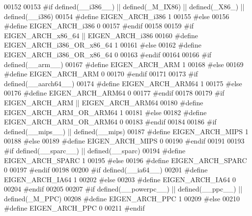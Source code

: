 \begin{DoxyCode}
00152 
00153 \textcolor{preprocessor}{#if defined(\_\_i386\_\_) || defined(\_M\_IX86) || defined(\_X86\_) || defined(\_\_i386)}
00154 \textcolor{preprocessor}{  #define EIGEN\_ARCH\_i386 1}
00155 \textcolor{preprocessor}{#else}
00156 \textcolor{preprocessor}{  #define EIGEN\_ARCH\_i386 0}
00157 \textcolor{preprocessor}{#endif}
00158 
00159 \textcolor{preprocessor}{#if EIGEN\_ARCH\_x86\_64 || EIGEN\_ARCH\_i386}
00160 \textcolor{preprocessor}{  #define EIGEN\_ARCH\_i386\_OR\_x86\_64 1}
00161 \textcolor{preprocessor}{#else}
00162 \textcolor{preprocessor}{  #define EIGEN\_ARCH\_i386\_OR\_x86\_64 0}
00163 \textcolor{preprocessor}{#endif}
00164 
00166 \textcolor{preprocessor}{#if defined(\_\_arm\_\_)}
00167 \textcolor{preprocessor}{  #define EIGEN\_ARCH\_ARM 1}
00168 \textcolor{preprocessor}{#else}
00169 \textcolor{preprocessor}{  #define EIGEN\_ARCH\_ARM 0}
00170 \textcolor{preprocessor}{#endif}
00171 
00173 \textcolor{preprocessor}{#if defined(\_\_aarch64\_\_)}
00174 \textcolor{preprocessor}{  #define EIGEN\_ARCH\_ARM64 1}
00175 \textcolor{preprocessor}{#else}
00176 \textcolor{preprocessor}{  #define EIGEN\_ARCH\_ARM64 0}
00177 \textcolor{preprocessor}{#endif}
00178 
00179 \textcolor{preprocessor}{#if EIGEN\_ARCH\_ARM || EIGEN\_ARCH\_ARM64}
00180 \textcolor{preprocessor}{  #define EIGEN\_ARCH\_ARM\_OR\_ARM64 1}
00181 \textcolor{preprocessor}{#else}
00182 \textcolor{preprocessor}{  #define EIGEN\_ARCH\_ARM\_OR\_ARM64 0}
00183 \textcolor{preprocessor}{#endif}
00184 
00186 \textcolor{preprocessor}{#if defined(\_\_mips\_\_) || defined(\_\_mips)}
00187 \textcolor{preprocessor}{  #define EIGEN\_ARCH\_MIPS 1}
00188 \textcolor{preprocessor}{#else}
00189 \textcolor{preprocessor}{  #define EIGEN\_ARCH\_MIPS 0}
00190 \textcolor{preprocessor}{#endif}
00191 
00193 \textcolor{preprocessor}{#if defined(\_\_sparc\_\_) || defined(\_\_sparc)}
00194 \textcolor{preprocessor}{  #define EIGEN\_ARCH\_SPARC 1}
00195 \textcolor{preprocessor}{#else}
00196 \textcolor{preprocessor}{  #define EIGEN\_ARCH\_SPARC 0}
00197 \textcolor{preprocessor}{#endif}
00198 
00200 \textcolor{preprocessor}{#if defined(\_\_ia64\_\_)}
00201 \textcolor{preprocessor}{  #define EIGEN\_ARCH\_IA64 1}
00202 \textcolor{preprocessor}{#else}
00203 \textcolor{preprocessor}{  #define EIGEN\_ARCH\_IA64 0}
00204 \textcolor{preprocessor}{#endif}
00205 
00207 \textcolor{preprocessor}{#if defined(\_\_powerpc\_\_) || defined(\_\_ppc\_\_) || defined(\_M\_PPC)}
00208 \textcolor{preprocessor}{  #define EIGEN\_ARCH\_PPC 1}
00209 \textcolor{preprocessor}{#else}
00210 \textcolor{preprocessor}{  #define EIGEN\_ARCH\_PPC 0}
00211 \textcolor{preprocessor}{#endif}

\end{DoxyCode}
